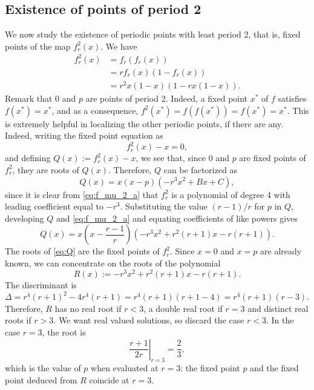 % 



\subsection{Existence of points of period 2}
\label{sec:2cycles}
We now study the existence of periodic points with least period 2, that is, fixed points of the map $f_r^2(x)$. We have
\begin{align}
f_r^2(x) &= f_r(f_r(x)) \nonumber\\
&= r f_r(x)(1-f_r(x)) \nonumber\\
&= r^2 x(1-x)(1-r x(1-x)). \label{eq:f_mu_2_a}
\end{align}
Remark that 0 and $p$ are points of period 2. Indeed, a fixed point $x^*$ of $f$ satisfies $f(x^*)=x^*$, and as a consequence, $f^2(x^*)=f(f(x^*))=f(x^*)=x^*$. This is extremely helpful in localizing the other periodic points, if there are any. Indeed, writing the fixed point equation as
\[
f_r^2(x)-x=0,
\]
and defining $Q(x):=f_r^2(x)-x$, we see that, since $0$ and $p$ are fixed points of $f_r^2$, they are roots of $Q(x)$. Therefore, $Q$ can be factorized as
\[
Q(x)=x(x-p)(-r^3x^2+Bx+C),
\]
since it is clear from \eqref{eq:f_mu_2_a} that $f_r^2$ is a polynomial of degree 4 with leading coefficient equal to $-r^3$. Substituting the value $(r-1)/r$ for $p$ in $Q$, developing $Q$ and \eqref{eq:f_mu_2_a} and equating coefficients of like powers gives
\begin{equation}\label{eq:Q}
Q(x)=x\left(x-\frac{r-1}{r}\right)\left(-r^3 x^2+r^2(r+1)x-r(r+1)\right).
\end{equation}
The roots of \eqref{eq:Q} are the fixed points of $f_r^2$. Since $x=0$ and $x=p$ are already known, we can concentrate on the roots of the polynomial
\[
R(x):=-r^3 x^2+r^2(r+1)x-r(r+1).
\]
The discriminant is $\Delta=r^4(r+1)^2-4r^4(r+1)=r^4(r+1)(r+1-4)=r^4(r+1)(r-3)$. Therefore, $R$ has no real root if $r<3$, a double real root if $r=3$ and distinct real roots if $r>3$. We want real valued solutions, so discard the case $r<3$. In the case $r=3$, the root is
\[
\left.\frac{r+1}{2r}\right|_{r=3}=\frac 23,
\]
which is the value of $p$ when evaluated at $r=3$: the fixed point $p$ and the fixed point deduced from $R$ coincide at $r=3$.

